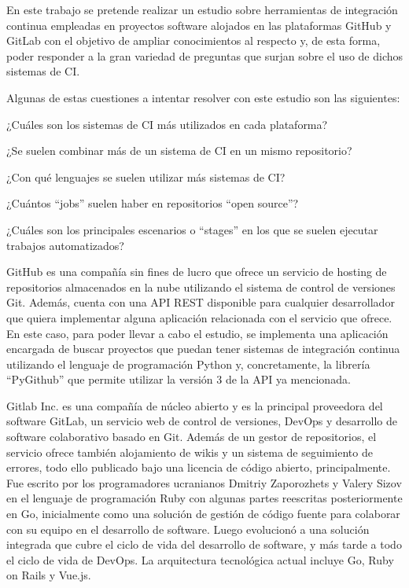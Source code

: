 En este trabajo se pretende realizar un estudio sobre herramientas de integración continua empleadas en proyectos software alojados en las plataformas GitHub y GitLab con el objetivo de ampliar conocimientos al respecto y, de esta forma, poder responder a la gran variedad de preguntas que surjan sobre el uso de dichos sistemas de CI.

Algunas de estas cuestiones a intentar resolver con este estudio son las siguientes:
\begin{compactitem}
    \item ¿Cuáles son los sistemas de CI más utilizados en cada plataforma?
    \item ¿Se suelen combinar más de un sistema de CI en un mismo repositorio?
    \item ¿Con qué lenguajes se suelen utilizar más sistemas de CI?
    \item ¿Cuántos ``jobs'' suelen haber en repositorios ``open source''?
    \item ¿Cuáles son los principales escenarios o ``stages'' en los que se suelen ejecutar trabajos automatizados?
\end{compactitem}

GitHub es una compañía sin fines de lucro que ofrece un servicio de hosting de repositorios almacenados en la nube utilizando el sistema de control de versiones Git. 
Además, cuenta con una API REST disponible para cualquier desarrollador que quiera implementar alguna aplicación relacionada con el servicio que ofrece. 
En este caso, para poder llevar a cabo el estudio, se implementa una aplicación encargada de buscar proyectos que puedan tener sistemas de integración continua utilizando el lenguaje de programación Python y, concretamente, la librería “PyGithub” que permite utilizar la versión 3 de la API ya mencionada.

Gitlab Inc. es una compañía de núcleo abierto y es la principal proveedora del software GitLab, un servicio web de control de versiones, DevOps y desarrollo de software colaborativo basado en Git. Además de un gestor de repositorios, el servicio ofrece también alojamiento de wikis y un sistema de seguimiento de errores, todo ello publicado bajo una licencia de código abierto, principalmente.
Fue escrito por los programadores ucranianos Dmitriy Zaporozhets y Valery Sizov en el lenguaje de programación Ruby con algunas partes reescritas posteriormente en Go, inicialmente como una solución de gestión de código fuente para colaborar con su equipo en el desarrollo de software. Luego evolucionó a una solución integrada que cubre el ciclo de vida del desarrollo de software, y más tarde a todo el ciclo de vida de DevOps. 
La arquitectura tecnológica actual incluye Go, Ruby on Rails y Vue.js.

